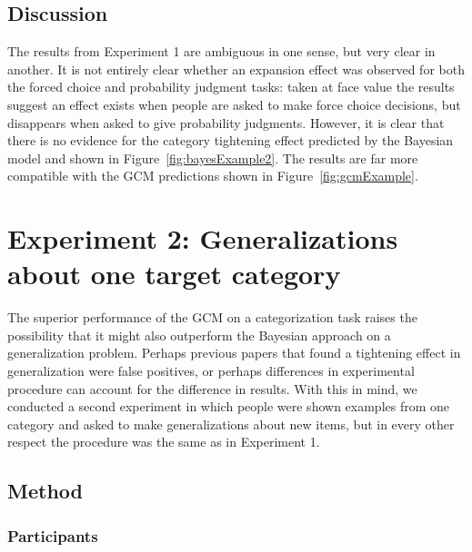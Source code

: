 \documentclass[doc,apacite]{apa6}
\begin{document}
\subsection{Discussion}

The results from Experiment 1 are ambiguous in one sense, but very clear in another. It is not entirely clear whether an expansion effect was observed for both the {\sc forced choice} and {\sc probability} judgment tasks: taken at face value the results suggest an effect exists when people are asked to make force choice decisions, but disappears when asked to give probability judgments. 
However, it is clear that there is no evidence for the category tightening effect predicted by the Bayesian model and shown in Figure~\ref{fig:bayesExample2}. The results are far more compatible with the GCM predictions shown in Figure~\ref{fig:gcmExample}. 



\section{Experiment 2: Generalizations about one target category}

The superior performance of the GCM on a categorization task raises the possibility that it might also outperform the Bayesian approach on a generalization problem. Perhaps previous papers that found a tightening effect in generalization were false positives, or perhaps differences in experimental procedure can account for the difference in results. With this in mind, we conducted a second experiment in which people were shown examples from one category and asked to make generalizations about new items, but in every other respect the procedure was the same as in Experiment 1. 

\subsection{Method}

\subsubsection{Participants}
\end{document}
